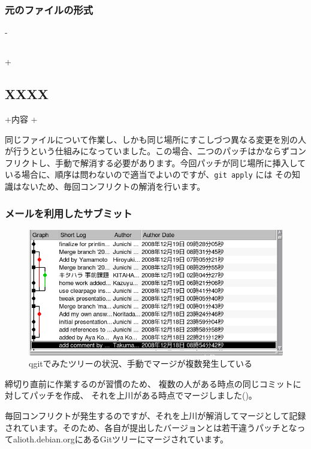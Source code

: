\documentclass[mingoth,a4paper]{jsarticle}
\begin{document}
\subsubsection{元のファイルの形式}

\begin{commandline}
-\subsection{}
+\subsection{XXXX}
+内容
+
\end{commandline}

同じファイルについて作業し、しかも同じ場所にすこしづつ異なる変更を別の人
が行うという仕組みになっていました。この場合、二つのパッチはかならずコン
フリクトし、手動で解消する必要があります。今回パッチが同じ場所に挿入して
いる場合に、順序は問わないので適当でよいのですが、\texttt{git apply} には
その知識はないため、毎回コンフリクトの解消を行います。

\subsubsection{メールを利用したサブミット}

\begin{figure}
 \includegraphics[width=\hsize]{image200901/qgit-trees.png}
 \caption{qgitでみたツリーの状況、手動でマージが複数発生している}
 \label{fig:mergedtokyodebian}
\end{figure}

締切り直前に作業するのが習慣のため、
複数の人がある時点の同じコミットに対してパッチを作成、
それを上川がある時点でマージしました()。

毎回コンフリクトが発生するのですが、それを上川が解消してマージとして記録
されています。そのため、各自が提出したバージョンとは若干違うパッチとなっ
てalioth.debian.orgにあるGitツリーにマージされています。
\end{document}
